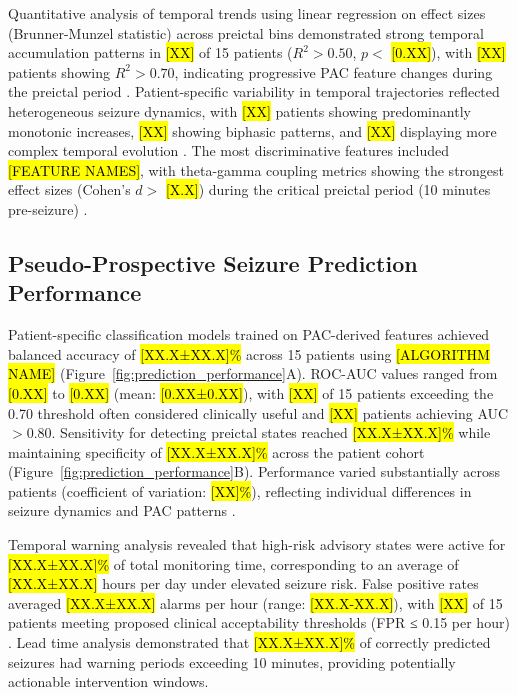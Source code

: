 Quantitative analysis of temporal trends using linear regression on effect sizes (Brunner-Munzel statistic) across preictal bins demonstrated strong temporal accumulation patterns in \hl{[XX]} of 15 patients ($R^2 > 0.50$, $p < $ \hl{[0.XX]}), with \hl{[XX]} patients showing $R^2 > 0.70$, indicating progressive PAC feature changes during the preictal period \cite{Kuhlmann2018SeizurePA}. Patient-specific variability in temporal trajectories reflected heterogeneous seizure dynamics, with \hl{[XX]} patients showing predominantly monotonic increases, \hl{[XX]} showing biphasic patterns, and \hl{[XX]} displaying more complex temporal evolution \cite{Aldahr2023PatientSpecificPPL}. The most discriminative features included \hl{[FEATURE NAMES]}, with theta-gamma coupling metrics showing the strongest effect sizes (Cohen's $d > $ \hl{[X.X]}) during the critical preictal period (10 minutes pre-seizure) \cite{Ahn2022TheFIT,Radiske2020CrossFrequencyPCAR}.
                  
\subsection{Pseudo-Prospective Seizure Prediction Performance}
Patient-specific classification models trained on PAC-derived features achieved balanced accuracy of \hl{[XX.X±XX.X]\%} across 15 patients using \hl{[ALGORITHM NAME]} \cite{Messaoud2021RandomFCR,Hussein2022MultiChannelVTE} (Figure~\ref{fig:prediction_performance}A). ROC-AUC values ranged from \hl{[0.XX]} to \hl{[0.XX]} (mean: \hl{[0.XX±0.XX]}), with \hl{[XX]} of 15 patients exceeding the 0.70 threshold often considered clinically useful \cite{Kuhlmann2018SeizurePA} and \hl{[XX]} patients achieving AUC $> 0.80$. Sensitivity for detecting preictal states reached \hl{[XX.X±XX.X]\%} while maintaining specificity of \hl{[XX.X±XX.X]\%} across the patient cohort (Figure~\ref{fig:prediction_performance}B). Performance varied substantially across patients (coefficient of variation: \hl{[XX]\%}), reflecting individual differences in seizure dynamics and PAC patterns \cite{Aldahr2023PatientSpecificPPL,Pinto2021APAP}.

Temporal warning analysis revealed that high-risk advisory states were active for \hl{[XX.X±XX.X]\%} of total monitoring time, corresponding to an average of \hl{[XX.X±XX.X]} hours per day under elevated seizure risk. False positive rates averaged \hl{[XX.X±XX.X]} alarms per hour (range: \hl{[XX.X-XX.X]}), with \hl{[XX]} of 15 patients meeting proposed clinical acceptability thresholds (FPR ≤ 0.15 per hour) \cite{Freestone2015SeizurePSBF}. Lead time analysis demonstrated that \hl{[XX.X±XX.X]\%} of correctly predicted seizures had warning periods exceeding 10 minutes, providing potentially actionable intervention windows.

